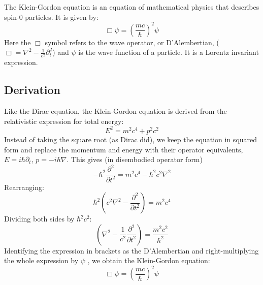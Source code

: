 \documentclass[12pt]{article}
\begin{document}
The Klein-Gordon equation is an equation of mathematical physics that describes spin-0 particles. It is given by:
\[
\Box \psi = \left(\frac{mc}{\hbar }\right)^2 \psi
\]
Here the $\Box$ symbol refers to the wave operator, or D'Alembertian, ($\Box = \nabla^2 - \frac{1}{c^2} \partial^2_t$)
 and $\psi$ is the wave function of a particle.
It is a Lorentz invariant expression.
\subsection{Derivation}
Like the Dirac equation, the Klein-Gordon equation is derived from the relativistic expression for total energy:
\[
E^2 = m^2c^4 + p^2c^2
\]
Instead of taking the square root (as Dirac did), we keep the equation in squared form and replace the momentum and energy with their operator equivalents, $E = i \hbar \partial_t$, $p = -i \hbar \nabla$. This gives (in disembodied operator form)
\[
-\hbar^2 \frac{\partial^2}{\partial t^2} = m^2 c^4 - \hbar^2 c^2 \nabla^2
\]
Rearranging:
\[
\hbar^2\left(c^2 \nabla^2 -\frac{\partial^2}{\partial t^2} \right)  = m^2 c^4
\]
Dividing both sides by $\hbar^2 c^2$:
\[
\left( \nabla^2 - \frac{1}{c^2}\frac{\partial^2}{\partial t^2} \right) =  \frac{m^2 c^2}{\hbar^2}
\]
Identifying the expression in brackets as the D'Alembertian and right-multiplying the whole expression by $\psi$ , we obtain the Klein-Gordon equation:
\[
\Box \psi = \left(\frac{mc}{\hbar }\right)^2 \psi
\]

\end{document}
